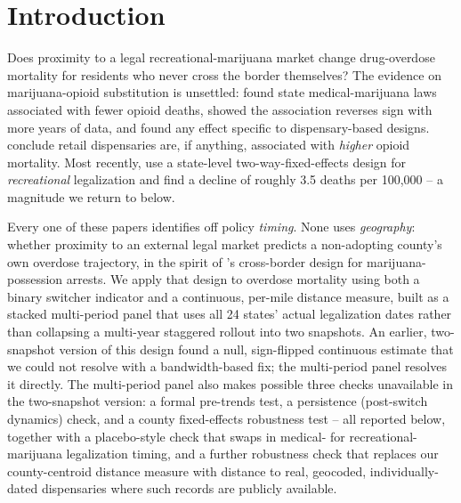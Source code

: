 \documentclass[12pt]{article}
\begin{document}
\newpage

\section{Introduction}

Does proximity to a legal recreational-marijuana market change
drug-overdose mortality for residents who never cross the border
themselves? The evidence on marijuana-opioid substitution is
unsettled: \citet{Bachhuber2014} found state medical-marijuana laws
associated with fewer opioid deaths, \citet{Shover2019} showed the
association reverses sign with more years of data, and
\citet{PowellPaculaJacobson2018} found any effect specific to
dispensary-based designs. \citet{MathurRuhm2022} conclude retail
dispensaries are, if anything, associated with \emph{higher} opioid
mortality. Most recently, \citet{Denkyirah2026} use a state-level
two-way-fixed-effects design for \emph{recreational} legalization and
find a decline of roughly 3.5 deaths per 100,000 -- a magnitude we
return to below.

Every one of these papers identifies off policy \emph{timing}. None
uses \emph{geography}: whether proximity to an external legal market
predicts a non-adopting county's own overdose trajectory, in the
spirit of \citet{HaoCowan2020}'s cross-border design for
marijuana-possession arrests. We apply that design to overdose
mortality using both a binary switcher indicator and a continuous,
per-mile distance measure, built as a stacked multi-period panel that
uses all 24 states' actual legalization dates rather than collapsing a
multi-year staggered rollout into two snapshots. An earlier,
two-snapshot version of this design found a null, sign-flipped
continuous estimate that we could not resolve with a bandwidth-based
fix; the multi-period panel resolves it directly. The multi-period
panel also makes possible three checks unavailable in the two-snapshot
version: a formal pre-trends test, a persistence (post-switch
dynamics) check, and a county fixed-effects robustness test -- all
reported below, together with a placebo-style check that swaps in
medical- for recreational-marijuana legalization timing, and a further
robustness check that replaces our county-centroid distance measure
with distance to real, geocoded, individually-dated dispensaries where
such records are publicly available.

\end{document}
